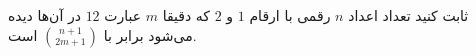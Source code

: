 \EXERCISE
ثابت کنید تعداد اعداد
$n$
رقمی با ارقام
$1$
و
$2$
که دقیقا
$m$
عبارت
$12$
در آن‌ها دیده می‌شود برابر با
$\binom{n+1}{2m+1}$
است.